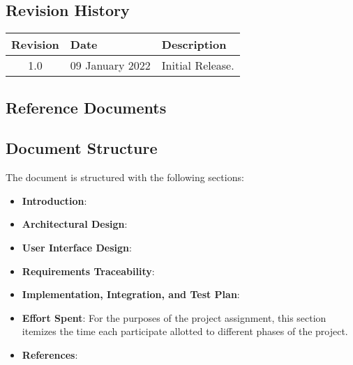 \subsection{Revision History}
\begin{flushleft}
\renewcommand{\arraystretch}{1.25}
\begin{tabular}{|c| l|>{\raggedright\arraybackslash}p{12cm} |} \hline
    \textbf{Revision} & \textbf{Date} & \textbf{Description}\\ \hline 
    1.0 & 09 January 2022 & Initial Release.\\
    \hline
\end{tabular}
\end{flushleft}

\subsection{Reference Documents}
\subsection{Document Structure}
The document is structured with the following sections:
\begin{itemize}
\item \textbf{Introduction}:
\item \textbf{Architectural Design}:
\item \textbf{User Interface Design}:
\item \textbf{Requirements Traceability}:
\item \textbf{Implementation, Integration, and Test Plan}:
\item \textbf{Effort Spent}: For the purposes of the project assignment, this section itemizes the time each participate allotted to different phases of the project. 
\item \textbf{References}:
\end{itemize}




